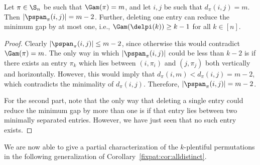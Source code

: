 \documentclass[12pt,twoside]{memoir}
\begin{document}
    \begin{lemma} \label{fixpat:lem:span}
      Let $\pi \in \S_n$ be such that $\Gam(\pi) = m$, and let $i,j$ be such that
      $d_\pi(i,j) = m$. Then $|\pspan_\pi(i,j)| = m-2$. Further, deleting one
      entry can reduce the minimum gap by at most one, i.e., $\Gam(\delpi(k))
      \geq k-1$ for all $k \in [n]$. 
    \end{lemma}
    \begin{proof}
      Clearly $|\pspan_\pi(i,j)| \leq m-2$, since otherwise this would contradict
      $\Gam(\pi) = m$. The only way in which $|\pspan_\pi(i,j)|$ could be less
      than $k-2$ is if there exists an entry $\pi_k$ which lies between
      $(i,\pi_i)$ and $(j,\pi_j)$ both vertically and horizontally. However, this
      would imply that $d_\pi(i,m) < d_\pi(i,j) = m-2$, which contradicts the
      minimality of $d_\pi(i,j)$. Therefore, $|\pspan_\pi(i,j)| = m-2$. 

      For the second part, note that the only way that deleting a single entry
      could reduce the minimum gap by more than one is if that entry lies between
      two minimally separated entries. However, we have just seen that no such
      entry exists. 
    \end{proof}

    We are now able to give a partial characterization of the $k$-plentiful
    permutations in the following generalization of
    Corollary~\ref{fixpat:cor:alldistinct}. 
\end{document}
